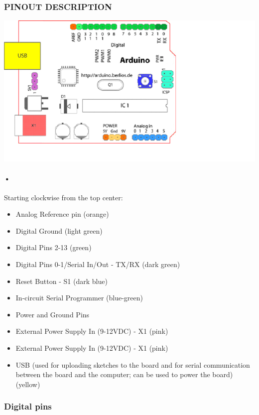 \documentclass[12pt]{extarticle}
\numberwithin{figure}{section}
\begin{document}
\subsubsection{PINOUT DESCRIPTION}
\includegraphics[scale=0.6]{AurdinoUNO.png}
\paragraph{•}
Starting clockwise from the top center: 
\begin{itemize}


\item Analog Reference pin (orange) 
\item Digital Ground (light green) 

\item Digital Pins 2-13 (green) 

\item Digital Pins 0-1/Serial In/Out - TX/RX (dark green) 

\item Reset Button - S1 (dark blue) 

\item In-circuit Serial Programmer (blue-green) 
\item Power and Ground Pins 
\item External Power Supply In (9-12VDC) - X1 (pink) 
\item External Power Supply In (9-12VDC) - X1 (pink) 
\item USB (used for uploading sketches to the board and for serial communication between the board and the computer; can be used to power the board) (yellow)
\end{itemize}
\subsubsection{Digital pins}
\end{document}
